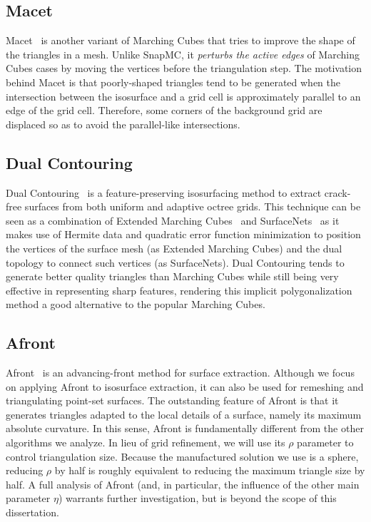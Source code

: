 \subsection{Macet} Macet~\cite{Dietrich:TVCG:2008} is another variant of Marching
Cubes that tries to improve the shape of the triangles in a
mesh. Unlike SnapMC, it \emph{perturbs the active edges} of Marching Cubes
cases by moving the vertices before the triangulation step.  The
motivation behind Macet is that poorly-shaped triangles tend to be
generated when the intersection between the isosurface and a grid cell
is approximately parallel to an edge of the grid cell. Therefore, some
corners of the background grid are displaced so as to avoid the
parallel-like intersections.

\subsection{Dual Contouring} Dual Contouring~\cite{Ju:2002:DCH:566654.566586} is a feature-preserving
isosurfacing method to extract crack-free surfaces from both uniform
and adaptive octree grids. This technique can be seen as a combination of
Extended Marching Cubes~\cite{kobbelt01} and SurfaceNets~\cite{gibson98} 
as it makes use of Hermite data and quadratic error function minimization 
to position the vertices of the surface mesh (as Extended Marching Cubes) 
and the dual topology to connect such vertices (as SurfaceNets).  Dual 
Contouring tends to generate better quality triangles than Marching Cubes 
while still being very effective in representing sharp features, rendering this
implicit polygonalization method a good alternative to the popular Marching Cubes.

\subsection{Afront} Afront~\cite{Schreiner06} is an advancing-front method
for surface extraction. Although we focus on applying Afront to
isosurface extraction, it can also be used for remeshing and
triangulating point-set surfaces. The outstanding feature of Afront is
that it generates triangles adapted to the local details of a surface,
namely its maximum absolute curvature. In this sense, Afront is
fundamentally different from the other algorithms we analyze. In lieu
of grid refinement, we will use its $\rho$ parameter to control
triangulation size. Because the manufactured solution we use is a
sphere, reducing $\rho$ by half is roughly equivalent to reducing the
maximum triangle size by half. A full analysis of Afront (and, in
particular, the influence of the other main parameter $\eta$) warrants
further investigation, but is beyond the scope of this dissertation.

